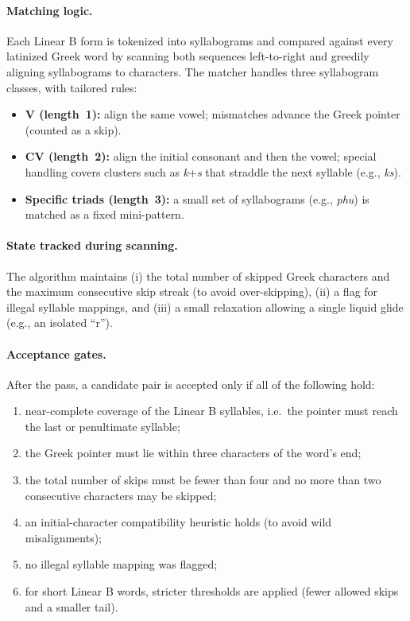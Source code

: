 \paragraph{Matching logic.}
Each Linear B form is tokenized into syllabograms and compared against every latinized Greek word by
scanning both sequences left-to-right and greedily aligning syllabograms to characters.
The matcher handles three syllabogram classes, with tailored rules:
\begin{itemize}[leftmargin=2em]
  \item \textbf{V (length~1):} align the same vowel; mismatches advance the Greek pointer (counted as a skip).
  \item \textbf{CV (length~2):} align the initial consonant and then the vowel; special handling covers clusters
        such as \textit{k}+\textit{s} that straddle the next syllable (e.g., \textit{ks}).
  \item \textbf{Specific triads (length~3):} a small set of syllabograms (e.g., \textit{phu}) is matched as a fixed mini-pattern.
\end{itemize}

\paragraph{State tracked during scanning.}
The algorithm maintains (i) the total number of skipped Greek characters and the maximum consecutive
skip streak (to avoid over-skipping), (ii) a flag for illegal syllable mappings, and (iii) a small
relaxation allowing a single liquid glide (e.g., an isolated ``r'').

\paragraph{Acceptance gates.}
After the pass, a candidate pair is accepted only if all of the following hold:
\begin{enumerate}[label=(\roman*), leftmargin=2em]
  \item near-complete coverage of the Linear B syllables, i.e.\ the pointer must reach the last or penultimate syllable;
  \item the Greek pointer must lie within three characters of the word's end;
  \item the total number of skips must be fewer than four and no more than two consecutive characters may be skipped;
  \item an initial-character compatibility heuristic holds (to avoid wild misalignments);
  \item no illegal syllable mapping was flagged;
  \item for short Linear B words, stricter thresholds are applied (fewer allowed skips and a smaller tail).
\end{enumerate}

